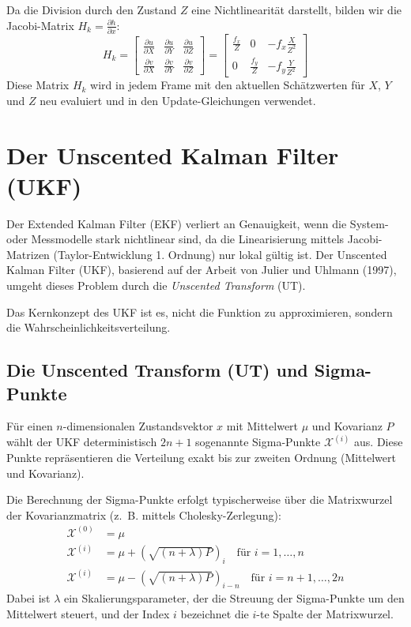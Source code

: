 \documentclass{article}
\begin{document}
Da die Division durch den Zustand $Z$ eine Nichtlinearität darstellt, bilden wir die Jacobi-Matrix $H_k = \frac{\partial h}{\partial x}$:
\begin{equation}
    H_k = \begin{bmatrix} 
    \frac{\partial u}{\partial X} & \frac{\partial u}{\partial Y} & \frac{\partial u}{\partial Z} \\ 
    \frac{\partial v}{\partial X} & \frac{\partial v}{\partial Y} & \frac{\partial v}{\partial Z} 
    \end{bmatrix} 
    = \begin{bmatrix} 
    \frac{f_x}{Z} & 0 & -f_x \frac{X}{Z^2} \\ 
    0 & \frac{f_y}{Z} & -f_y \frac{Y}{Z^2} 
    \end{bmatrix}
\end{equation}
Diese Matrix $H_k$ wird in jedem Frame mit den aktuellen Schätzwerten für $X$, $Y$ und $Z$ neu evaluiert und in den Update-Gleichungen verwendet.


\section{Der Unscented Kalman Filter (UKF)}
\label{sec:ukf}

Der Extended Kalman Filter (EKF) verliert an Genauigkeit, wenn die System- oder Messmodelle stark nichtlinear sind, da die Linearisierung mittels Jacobi-Matrizen (Taylor-Entwicklung 1. Ordnung) nur lokal gültig ist. Der Unscented Kalman Filter (UKF), basierend auf der Arbeit von Julier und Uhlmann (1997), umgeht dieses Problem durch die \textit{Unscented Transform} (UT).

Das Kernkonzept des UKF ist es, nicht die Funktion zu approximieren, sondern die Wahrscheinlichkeitsverteilung.




\subsection{Die Unscented Transform (UT) und Sigma-Punkte}
Für einen $n$-dimensionalen Zustandsvektor $x$ mit Mittelwert $\mu$ und Kovarianz $P$ wählt der UKF deterministisch $2n + 1$ sogenannte Sigma-Punkte $\mathcal{X}^{(i)}$ aus. Diese Punkte repräsentieren die Verteilung exakt bis zur zweiten Ordnung (Mittelwert und Kovarianz).

Die Berechnung der Sigma-Punkte erfolgt typischerweise über die Matrixwurzel der Kovarianzmatrix (z.~B. mittels Cholesky-Zerlegung):
\begin{align}
    \mathcal{X}^{(0)} &= \mu \\
    \mathcal{X}^{(i)} &= \mu + \left( \sqrt{(n + \lambda) P} \right)_i \quad \text{für } i = 1, \dots, n \\
    \mathcal{X}^{(i)} &= \mu - \left( \sqrt{(n + \lambda) P} \right)_{i-n} \quad \text{für } i = n+1, \dots, 2n
\end{align}
Dabei ist $\lambda$ ein Skalierungsparameter, der die Streuung der Sigma-Punkte um den Mittelwert steuert, und der Index $i$ bezeichnet die $i$-te Spalte der Matrixwurzel.
\end{document}
